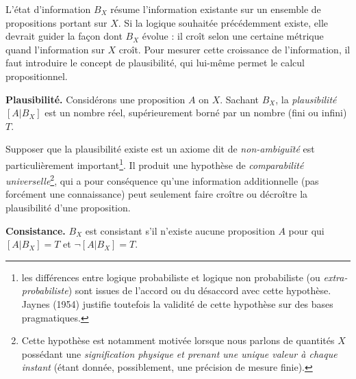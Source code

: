 L'état d'information $B_X$ résume l'information existante sur un ensemble de propositions portant sur $X$. Si la logique souhaitée précédemment existe, elle devrait guider la fa\c con dont  $B_X$ évolue : il croît selon une certaine métrique quand l'information sur $X$ croît. Pour mesurer cette croissance de l'information, il faut introduire le concept de plausibilité, qui lui-même permet le calcul propositionnel. \\


\begin{definition}{\bf Plausibilité.}
Considérons une proposition $A$ on $X$. Sachant $B_X$, la \emph{plausibilité} $[A|B_X]$ est un nombre réel, supérieurement borné par un nombre (fini ou infini) $T$.  
\end{definition}

Supposer que la plausibilité existe est un axiome dit de  \emph{non-ambigu\"ité} est particulièrement important\footnote{les différences entre logique probabiliste et logique non probabiliste (ou {\it extra-probabiliste}) sont issues de l'accord ou du désaccord avec cette hypothèse. Jaynes (1954)  justifie toutefois la validité de cette hypothèse sur des bases pragmatiques.}. Il produit  une hypothèse de {\it comparabilité universelle}\footnote{Cette hypothèse est notamment motivée lorsque nous parlons de quantités $X$ possédant une \emph{signification physique et prenant une unique valeur à chaque instant} (étant donnée, possiblement, une précision de mesure finie).}, qui a pour conséquence qu'une information additionnelle (pas forcément une connaissance)  peut seulement faire croître ou décroître la plausibilité d'une proposition. \\

\begin{definition}{\bf Consistance.}
$B_X$ est consistant s'il n'existe aucune proposition  $A$ pour qui  $[A|B_X]=T$ et $\neg[A|B_X]=T$.  
\end{definition}


